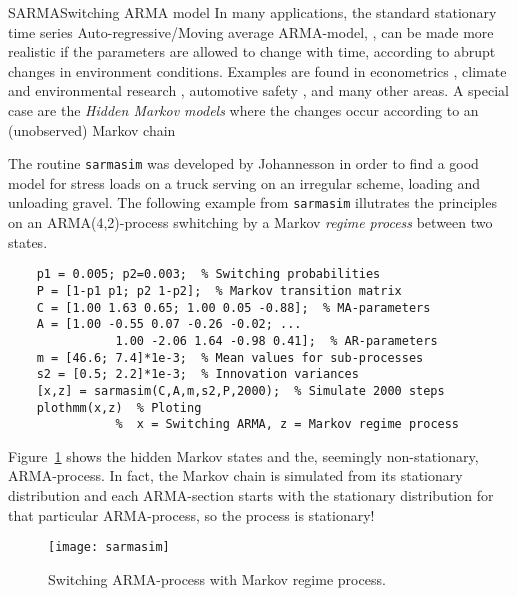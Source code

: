 \begin{rtex}{SARMA}{Switching ARMA model}
In many applications, the standard stationary  time series Auto-regressive/Moving average ARMA-model, 
\cite[Ch.~7]{LindgrenRootzenSandsten2014}, can be made more realistic if the 
parameters are allowed to change with time, according to abrupt changes in environment conditions. 
Examples are found in econometrics \cite{Hamilton1989}, climate and environmental research \cite{AilliotMonbet2012}, automotive safety   \cite{Johannesson1998Rainflow}, and many other areas. 
A special case are the {\it Hidden Markov models} where the changes occur according to an 
(unobserved)  Markov chain

The \wf{} routine {\tt sarmasim} was developed by  Johannesson \cite{Johannesson1998Rainflow} 
in order to find a good model for stress loads on a truck serving on an irregular scheme, loading 
and unloading gravel. 
 The following example from {\tt sarmasim} illutrates the principles on an ARMA(4,2)-process swhitching
by a Markov {\it regime process} between two states.  
{\small\begin{verbatim}
    p1 = 0.005; p2=0.003;  % Switching probabilities
    P = [1-p1 p1; p2 1-p2];  % Markov transition matrix
    C = [1.00 1.63 0.65; 1.00 0.05 -0.88];  % MA-parameters 
    A = [1.00 -0.55 0.07 -0.26 -0.02; ... 
    		   1.00 -2.06 1.64 -0.98 0.41];  % AR-parameters
    m = [46.6; 7.4]*1e-3;  % Mean values for sub-processes
    s2 = [0.5; 2.2]*1e-3;  % Innovation variances
    [x,z] = sarmasim(C,A,m,s2,P,2000);  % Simulate 2000 steps
    plothmm(x,z)  % Ploting
    		   %  x = Switching ARMA, z = Markov regime process
\end{verbatim}}
Figure~\ref{fig:sarmasim} shows the hidden Markov states and the, seemingly non-stationary,  
ARMA-process. In fact, the Markov chain is simulated from its stationary distribution and each 
ARMA-section starts with the stationary distribution for that particular ARMA-process, so 
the process is stationary! 
\end{rtex}
\begin{figure}[tbh]
\centerline{
\texttt{[image: sarmasim]}
}
\caption{Switching ARMA-process with Markov regime process.}
\label{fig:sarmasim}
\end{figure}


